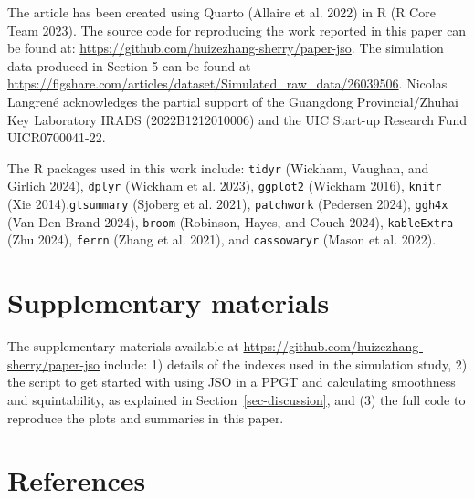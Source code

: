 \documentclass[
  12pt,
]{interact}
\theoremstyle{plain}
\begin{document}
The article has been created using Quarto (Allaire et al. 2022) in R (R
Core Team 2023). The source code for reproducing the work reported in
this paper can be found at:
\url{https://github.com/huizezhang-sherry/paper-jso}. The simulation
data produced in Section 5 can be found at
\url{https://figshare.com/articles/dataset/Simulated_raw_data/26039506}.
Nicolas Langrené acknowledges the partial support of the Guangdong
Provincial/Zhuhai Key Laboratory IRADS (2022B1212010006) and the UIC
Start-up Research Fund UICR0700041-22.

The R packages used in this work include: \texttt{tidyr} (Wickham,
Vaughan, and Girlich 2024), \texttt{dplyr} (Wickham et al. 2023),
\texttt{ggplot2} (Wickham 2016), \texttt{knitr} (Xie
2014),\texttt{gtsummary} (Sjoberg et al. 2021), \texttt{patchwork}
(Pedersen 2024), \texttt{ggh4x} (Van Den Brand 2024), \texttt{broom}
(Robinson, Hayes, and Couch 2024), \texttt{kableExtra} (Zhu 2024),
\texttt{ferrn} (Zhang et al. 2021), and \texttt{cassowaryr} (Mason et
al. 2022).

\section*{Supplementary materials}\label{supplementary-materials}

The supplementary materials available at
\url{https://github.com/huizezhang-sherry/paper-jso} include: 1) details
of the indexes used in the simulation study, 2) the script to get
started with using JSO in a PPGT and calculating smoothness and
squintability, as explained in Section~\ref{sec-discussion}, and (3) the
full code to reproduce the plots and summaries in this paper.

\section*{References}\label{references}
\end{document}
